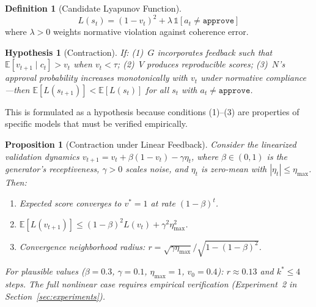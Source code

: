 \documentclass[11pt,a4paper]{article}
\newtheorem{proposition}{Proposition}[section]
\newtheorem{hypothesis}{Hypothesis}[section]
\theoremstyle{definition}
\newtheorem{definition}{Definition}[section]
\begin{document}
\begin{definition}[Candidate Lyapunov Function]
\begin{equation}
L(s_t) = (1 - v_t)^2 + \lambda\, \mathbb{1}[a_t \neq \texttt{approve}]
\end{equation}
where $\lambda > 0$ weights normative violation against coherence error.
\end{definition}

\begin{hypothesis}[Contraction]
\label{hyp:contraction}
If: (1)~$G$ incorporates feedback such that $\mathbb{E}[v_{t+1} \mid c_t] > v_t$ when $v_t < \tau$; (2)~$V$ produces reproducible scores; (3)~$N$'s approval probability increases monotonically with $v_t$ under normative compliance---then $\mathbb{E}[L(s_{t+1})] < \mathbb{E}[L(s_t)]$ for all $s_t$ with $a_t \neq \texttt{approve}$.
\end{hypothesis}

This is formulated as a hypothesis because conditions (1)--(3) are properties of specific models that must be verified empirically.

\begin{proposition}[Contraction under Linear Feedback]
\label{prop:linearcontraction}
Consider the linearized validation dynamics $v_{t+1} = v_t + \beta(1 - v_t) - \gamma\eta_t$, where $\beta \in (0,1)$ is the generator's receptiveness, $\gamma > 0$ scales noise, and $\eta_t$ is zero-mean with $|\eta_t| \leq \eta_\text{max}$. Then:
\begin{enumerate}[leftmargin=*,itemsep=2pt]
\item Expected score converges to $v^* = 1$ at rate $(1-\beta)^t$.
\item $\mathbb{E}[L(v_{t+1})] \leq (1-\beta)^2 L(v_t) + \gamma^2 \eta_\text{max}^2$.
\item Convergence neighborhood radius: $r = \sqrt{\gamma\eta_\text{max}} / \sqrt{1 - (1-\beta)^2}$.
\end{enumerate}
For plausible values ($\beta=0.3$, $\gamma=0.1$, $\eta_\text{max}=1$, $v_0=0.4$): $r \approx 0.13$ and $k^* \leq 4$ steps. The full nonlinear case requires empirical verification (Experiment~2 in Section~\ref{sec:experiments}).
\end{proposition}



\end{document}
